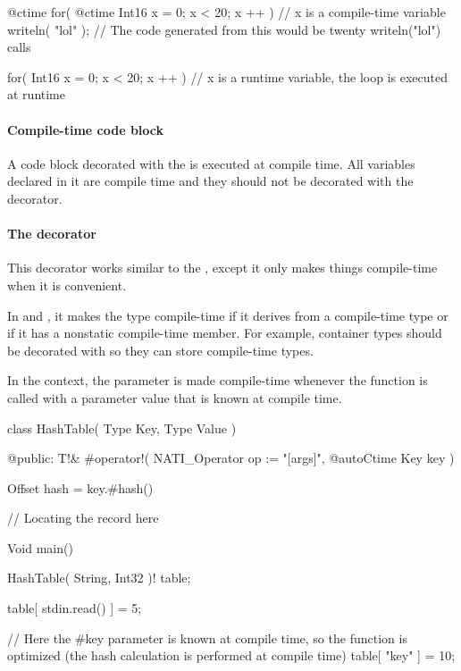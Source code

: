 \begin{code}
@ctime for( @ctime Int16 x = 0; x < 20; x ++ ) {
	// x is a compile-time variable
	writeln( "lol" );
	// The code generated from this would be twenty writeln("lol") calls
}

for( Int16 x = 0; x < 20; x ++ ) {
	// x is a runtime variable, the loop is executed at runtime	
}
\end{code}

\paragraph{Compile-time code block} A code block decorated with the  is executed at compile time. All variables declared in it are compile time and they should not be decorated with the  decorator.

\paragraph{The  decorator} \label{decorator:autoCtime} This decorator works similar to the , except it only makes things compile-time when it is convenient.

In  and , it makes the type compile-time if it derives from a compile-time type or if it has a nonstatic compile-time member. For example, container types should be decorated with  so they can store compile-time types.

In the  context, the parameter is made compile-time whenever the function is called with a parameter value that is known at compile time.
\begin{code}
class HashTable( Type Key, Type Value ) {

@public:
	T!& #operator!( NATI_Operator op := "[args]", @autoCtime Key key ) {
		Offset hash = key.#hash() %
		
		// Locating the record here 
	}
	
}

Void main() {
	HashTable( String, Int32 )! table;
	
	table[ stdin.read() ] = 5;
	
	// Here the #key parameter is known at compile time, so the function is optimized (the hash calculation is performed at compile time)
	table[ "key" ] = 10;
}
\end{code}

